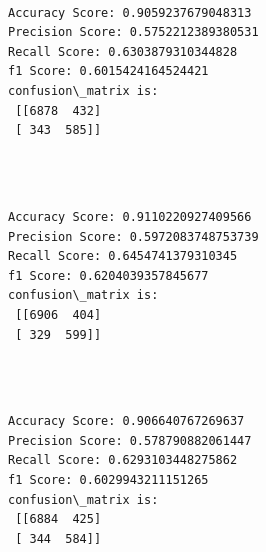 \documentclass[11pt]{article}
\begin{document}
   

    \begin{center}
    \end{center}
    { \hspace*{\fill} \\}
    
    \begin{Verbatim}[commandchars=\\\{\}]
Accuracy Score: 0.9059237679048313
Precision Score: 0.5752212389380531
Recall Score: 0.6303879310344828
f1 Score: 0.6015424164524421
confusion\_matrix is: 
 [[6878  432]
 [ 343  585]] 


    \end{Verbatim}

 

    \begin{center}
    \end{center}
    { \hspace*{\fill} \\}
    
 

    \begin{Verbatim}[commandchars=\\\{\}]
Accuracy Score: 0.9110220927409566
Precision Score: 0.5972083748753739
Recall Score: 0.6454741379310345
f1 Score: 0.6204039357845677
confusion\_matrix is: 
 [[6906  404]
 [ 329  599]] 


    \end{Verbatim}

    \begin{center}
    \end{center}
    { \hspace*{\fill} \\}
    
    

    \begin{Verbatim}[commandchars=\\\{\}]
Accuracy Score: 0.906640767269637
Precision Score: 0.578790882061447
Recall Score: 0.6293103448275862
f1 Score: 0.6029943211151265
confusion\_matrix is: 
 [[6884  425]
 [ 344  584]] 


    \end{Verbatim}

    \begin{center}
    \end{center}
    { \hspace*{\fill} \\}
    
\end{document}
